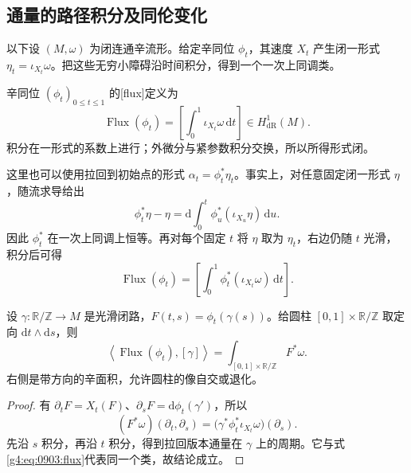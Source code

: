 \subsection{通量的路径积分及同伦变化}
\label{g4:subsec:0903:03}

以下设 \((M,\omega)\) 为闭连通辛流形。给定辛同位 \(\phi_t\)，其速度 \(X_t\) 产生闭一形式 \(\eta_t=\iota_{X_t}\omega\)。把这些无穷小障碍沿时间积分，得到一个一次上同调类。

\begin{definition}\label{g4:def:0903:flux}
	辛同位 \((\phi_t)_{0\le t\le1}\) 的[flux]定义为
	\begin{equation}\label{g4:eq:0903:flux}
		\operatorname{Flux}(\phi_t)
		=\left[\int_0^1\iota_{X_t}\omega\,\mathrm{d}t\right]
		\in H^1_{\mathrm{dR}}(M).
	\end{equation}
	积分在一形式的系数上进行；外微分与紧参数积分交换，所以所得形式闭。
\end{definition}

这里也可以使用拉回到初始点的形式 \(\alpha_t=\phi_t^*\eta_t\)。事实上，对任意固定闭一形式 \(\eta\)，随流求导给出
\begin{equation}\label{g4:eq:0903:trivial-cohomology-action}
	\phi_t^*\eta-\eta
	=\mathrm{d}\int_0^t\phi_u^*(\iota_{X_u}\eta)\,\mathrm{d}u.
\end{equation}
因此 \(\phi_t^*\) 在一次上同调上恒等。再对每个固定 \(t\) 将 \(\eta\) 取为 \(\eta_t\)，右边仍随 \(t\) 光滑，积分后可得
\[
	\operatorname{Flux}(\phi_t)
	=\left[\int_0^1\phi_t^*(\iota_{X_t}\omega)\,\mathrm{d}t\right].
\]

\begin{proposition}\label{g4:prop:0903:swept-area}
	设 \(\gamma:\mathbb R/\mathbb Z\to M\) 是光滑闭路，\(F(t,s)=\phi_t(\gamma(s))\)。给圆柱 \([0,1]\times\mathbb R/\mathbb Z\) 取定向 \(\mathrm{d}t\wedge\mathrm{d}s\)，则
	\[
		\left\langle\operatorname{Flux}(\phi_t),[\gamma]\right\rangle
		=\int_{[0,1]\times\mathbb R/\mathbb Z}F^*\omega.
	\]
	右侧是带方向的辛面积，允许圆柱的像自交或退化。
\end{proposition}
\begin{proof}
	有 \(\partial_tF=X_t(F)\)、\(\partial_sF=\mathrm{d}\phi_t(\gamma')\)，所以
	\[
		(F^*\omega)(\partial_t,\partial_s)
		=\bigl(\gamma^*\phi_t^*\iota_{X_t}\omega\bigr)(\partial_s).
	\]
	先沿 \(s\) 积分，再沿 \(t\) 积分，得到拉回版本通量在 \(\gamma\) 上的周期。它与式\eqref{g4:eq:0903:flux}代表同一个类，故结论成立。
\end{proof}

